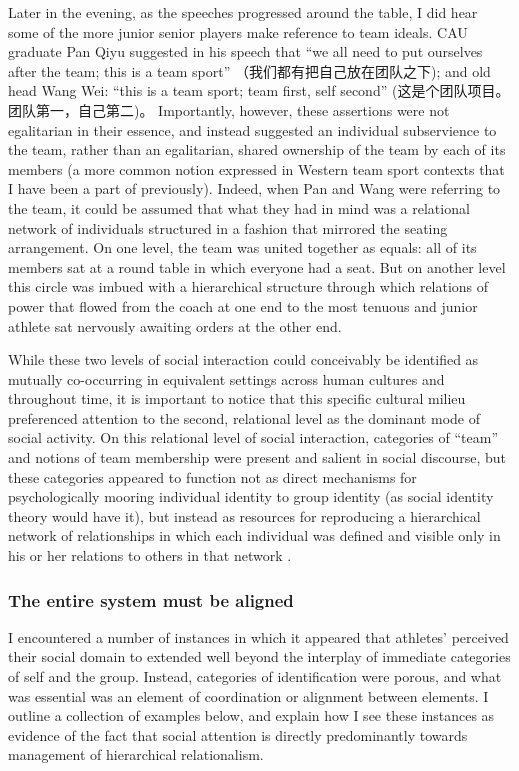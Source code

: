 \begin{CJK}{UTF8}{gbsn}
Later in the evening, as the speeches progressed around the table, I did hear some of the more junior senior players make reference to team ideals.   CAU graduate Pan Qiyu suggested in his speech that ``we all need to put ourselves after the team; this is a team sport'' （我们都有把自己放在团队之下); and old head Wang Wei: ``this is a team sport; team first, self second'' (这是个团队项目。团队第一，自己第二)。 Importantly, however, these assertions were not egalitarian in their essence, and instead suggested an individual subservience to the team, rather than an egalitarian, shared ownership of the team by each of its members (a more common notion expressed in Western team sport contexts that I have been a part of previously).  Indeed, when Pan and Wang were referring to the team, it could be assumed that what they had in mind was a relational network of individuals structured in a fashion that mirrored the seating arrangement. On one level, the team was united together as equals: all of its members sat at a round table in which everyone had a seat. But on another level this circle was imbued with a hierarchical structure through which relations of power that flowed from the coach at one end to the most tenuous and junior athlete sat nervously awaiting orders at the other end.

While these two levels of social interaction could conceivably be identified as mutually co-occurring in equivalent settings across human cultures and throughout time, it is important to notice that this specific cultural milieu preferenced attention to the second, relational level as the dominant mode of social activity.  On this relational level of social interaction, categories of ``team'' and notions of team membership were present and salient in social discourse, but these categories appeared to function not as direct mechanisms for psychologically mooring individual identity to group identity (as social identity theory would have it), but instead as resources for reproducing a hierarchical network of relationships in which each individual was defined and visible only in his or her relations to others in that network \cite{Yuki2003}.



\subsubsection{The entire system must be aligned \label{sect:systemAligned}}
I encountered a number of instances in which it appeared that athletes' perceived their social domain to extended well beyond the interplay of immediate categories of self and the group.  Instead, categories of identification were porous, and what was essential was an element of coordination or alignment between elements. I outline a collection of examples below, and explain how I see these instances as evidence of the fact that social attention is directly predominantly towards management of hierarchical relationalism.


\end{CJK}
